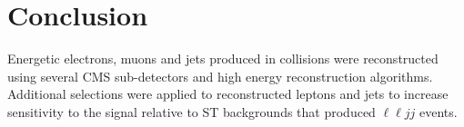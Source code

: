 \section{Conclusion}
\label{sec:recoConclusion}
Energetic electrons, muons and jets produced in collisions were reconstructed using several CMS sub-detectors and high energy 
reconstruction algorithms.  Additional selections were applied to reconstructed leptons and jets to increase sensitivity to the \WR 
signal relative to ST backgrounds that produced $\ell\ell jj$ events.

